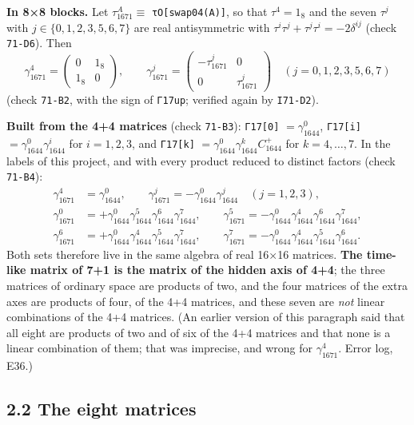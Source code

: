 \documentclass[
  10pt,
]{article}
\begin{document}
\textbf{In 8×8 blocks.} Let \(\tau_{1671}^A\equiv\)
\texttt{τO{[}swap04(A){]}}, so that \(\tau^4=1_8\) and the seven
\(\tau^j\) with \(j\in\{0,1,2,3,5,6,7\}\) are real antisymmetric with
\(\tau^i\tau^j+\tau^j\tau^i=-2\delta^{ij}\) (check \texttt{71-D6}). Then
\[\gamma_{1671}^4=\begin{pmatrix}0&1_8\\1_8&0\end{pmatrix},\qquad
\gamma_{1671}^j=\begin{pmatrix}-\tau_{1671}^j&0\\0&\tau_{1671}^j\end{pmatrix}\quad(j=0,1,2,3,5,6,7)\tag{2.2}\]
(check \texttt{71-B2}, with the sign of \texttt{Γ17up}; verified again
by \texttt{I71-D2}).

\textbf{Built from the 4+4 matrices} (check \texttt{71-B3}):
\texttt{Γ17{[}0{]}} \(=\gamma_{1644}^0\), \texttt{Γ17{[}i{]}}
\(=\gamma_{1644}^0\gamma_{1644}^i\) for \(i=1,2,3\), and
\texttt{Γ17{[}k{]}} \(=\gamma_{1644}^0\gamma_{1644}^kC_{1644}^{+}\) for
\(k=4,\dots,7\). In the labels of this project, and with every product
reduced to distinct factors (check \texttt{71-B4}): \[\begin{aligned}
\gamma_{1671}^4&=\gamma_{1644}^0,\qquad\gamma_{1671}^j=-\gamma_{1644}^0\gamma_{1644}^j\quad(j=1,2,3),\\
\gamma_{1671}^0&=+\gamma_{1644}^0\gamma_{1644}^5\gamma_{1644}^6\gamma_{1644}^7,\qquad
\gamma_{1671}^5=-\gamma_{1644}^0\gamma_{1644}^4\gamma_{1644}^6\gamma_{1644}^7,\\
\gamma_{1671}^6&=+\gamma_{1644}^0\gamma_{1644}^4\gamma_{1644}^5\gamma_{1644}^7,\qquad
\gamma_{1671}^7=-\gamma_{1644}^0\gamma_{1644}^4\gamma_{1644}^5\gamma_{1644}^6 .
\end{aligned}\tag{2.2a}\] Both sets therefore live in the same algebra
of real 16×16 matrices. \textbf{The time-like matrix of 7+1 is the
matrix of the hidden axis of 4+4}; the three matrices of ordinary space
are products of two, and the four matrices of the extra axes are
products of four, of the 4+4 matrices, and these seven are \emph{not}
linear combinations of the 4+4 matrices. (An earlier version of this
paragraph said that all eight are products of two and of six of the 4+4
matrices and that none is a linear combination of them; that was
imprecise, and wrong for \(\gamma_{1671}^4\). Error log, E36.)

\hypertarget{the-eight-matrices-1}{%
\subsection{2.2 The eight matrices}\label{the-eight-matrices-1}}
\end{document}
